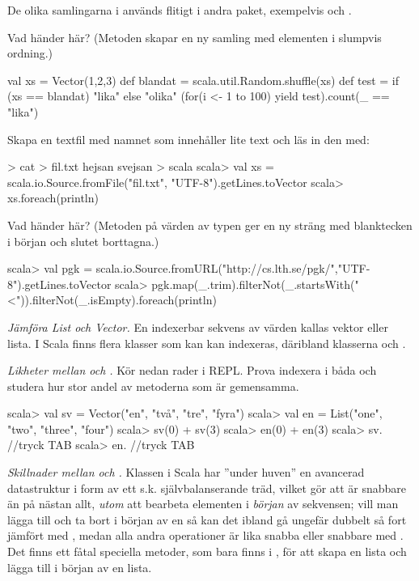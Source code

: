 \Subtask \code{}

\Subtask \code{}	





\Task De olika samlingarna i  används flitigt i andra paket, exempelvis  och . 

\Subtask Vad händer här? (Metoden  skapar en ny samling med elementen i slumpvis ordning.)
\begin{Code}
val xs = Vector(1,2,3)
def blandat = scala.util.Random.shuffle(xs)
def test = if (xs == blandat) "lika" else "olika"
(for(i <- 1 to 100) yield test).count(_ == "lika")
\end{Code}


\Subtask Skapa en textfil med namnet  som innehåller lite text och läs in den med: \\
\begin{REPL}
> cat > fil.txt
hejsan
svejsan
> scala
scala> val xs = scala.io.Source.fromFile("fil.txt", "UTF-8").getLines.toVector
scala> xs.foreach(println)
\end{REPL}


\Subtask Vad händer här? (Metoden  på värden av typen  ger en ny sträng med blanktecken i början och slutet borttagna.) 
\begin{REPL}
scala> val pgk = scala.io.Source.fromURL("http://cs.lth.se/pgk/","UTF-8").getLines.toVector
scala> pgk.map(_.trim).filterNot(_.startsWith("<")).filterNot(_.isEmpty).foreach(println)
\end{REPL}



\Task \emph{Jämföra List och Vector.} En indexerbar sekvens av värden kallas vektor eller lista. I Scala finns flera klasser som kan kan indexeras, däribland klasserna  och . 

\Subtask \emph{Likheter mellan  och .} Kör nedan rader i REPL. Prova indexera i båda och studera hur stor andel av metoderna som är gemensamma.
\begin{REPL}
scala> val sv = Vector("en", "två", "tre", "fyra")
scala> val en = List("one", "two", "three", "four")
scala> sv(0) + sv(3)
scala> en(0) + en(3)
scala> sv. //tryck TAB 
scala> en. //tryck TAB
\end{REPL}

\Subtask \emph{Skillnader mellan  och .} Klassen  i Scala har ''under huven'' en avancerad datastruktur i form av ett s.k. självbalanserande träd, vilket gör att  är snabbare än  på nästan allt, \emph{utom} att bearbeta elementen i \emph{början} av sekvensen; vill man lägga till och ta bort i början av en  så kan det ibland gå ungefär dubbelt så fort jämfört med , medan alla andra operationer är lika snabba eller snabbare med . Det finns ett fåtal speciella metoder, som bara finns i , för att skapa en lista och lägga till i början av en lista. 

